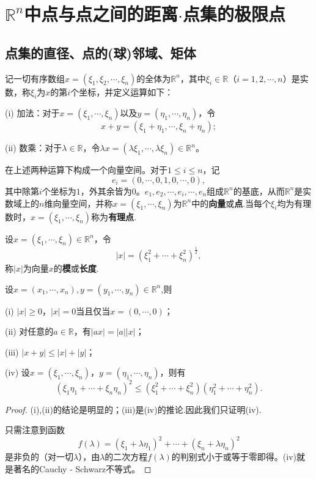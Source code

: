 \documentclass[../../main.tex]{subfiles}
\begin{document}
\section{$\mathbb{R}^n$中点与点之间的距离$\cdot$点集的极限点}

\subsection{点集的直径、点的(球)邻域、矩体}

\begin{definition}\label{definition:Rn与Rn中的运算}
  记一切有序数组\(x = (\xi_1,\xi_2,\cdots,\xi_n)\)的全体为\(\mathbb{R}^n\)，其中\(\xi_i\in\mathbb{R}\)（\(i = 1,2,\cdots,n\)）是实数，称\(\xi_i\)为\(x\)的第\(i\)个坐标，并定义运算如下：

(i) 加法：对于\(x = (\xi_1,\cdots,\xi_n)\)以及\(y = (\eta_1,\cdots,\eta_n)\)，令
\[x + y = (\xi_1+\eta_1,\cdots,\xi_n+\eta_n);\]

(ii) 数乘：对于\(\lambda\in\mathbb{R}\)，令\(\lambda x = (\lambda\xi_1,\cdots,\lambda\xi_n)\in\mathbb{R}^n\)。

在上述两种运算下构成一个向量空间。对于\(1\leqslant i\leqslant n\)，记
\[e_i = (0,\cdots,0,1,0,\cdots,0),\]
其中除第\(i\)个坐标为\(1\)，外其余皆为\(0\)。\(e_1,e_2,\cdots,e_i,\cdots,e_n\)组成\(\mathbb{R}^n\)的基底，从而\(\mathbb{R}^n\)是实数域上的\(n\)维向量空间，并称\(x = (\xi_1,\cdots,\xi_n)\)为\(\mathbb{R}^n\)中的\textbf{向量}或\textbf{点}.当每个\(\xi_i\)均为有理数时，\(x = (\xi_1,\cdots,\xi_n)\)称为\textbf{有理点}.
\end{definition}

\begin{definition}
设\(x = (\xi_1,\cdots,\xi_n)\in\mathbb{R}^n\)，令
\[|x| = (\xi_1^2+\cdots+\xi_n^2)^{\frac{1}{2}},\]
称\(|x|\)为向量\(x\)的\textbf{模}或\textbf{长度}.
\end{definition}

\begin{proposition}[向量的模的性质]\label{proposition:向量的模的性质}
设\(x=(x_1,\cdots ,x_n),y=\left( y_1,\cdots ,y_n \right) \in \mathbb{R} ^n\),则

(i) \(|x|\geqslant0\)，\(|x| = 0\)当且仅当\(x=(0,\cdots,0)\)；

(ii) 对任意的\(a\in\mathbb{R}\)，有\(|ax| = |a||x|\)；

(iii) \(|x + y|\leqslant|x|+|y|\)；

(iv) 设\(x = (\xi_1,\cdots,\xi_n)\)，\(y = (\eta_1,\cdots,\eta_n)\)，则有
\[(\xi_1\eta_1+\cdots+\xi_n\eta_n)^2\leqslant(\xi_1^2+\cdots+\xi_n^2)(\eta_1^2+\cdots+\eta_n^2).\]
\end{proposition}
\begin{proof}
  (i),(ii)的结论是明显的；(iii)是(iv)的推论.因此我们只证明(iv).

只需注意到函数
\[f(\lambda)=(\xi_1+\lambda\eta_1)^2+\cdots+(\xi_n+\lambda\eta_n)^2\]
是非负的（对一切\(\lambda\)），由\(\lambda\)的二次方程\(f(\lambda)\)的判别式小于或等于零即得。(iv)就是著名的Cauchy - Schwarz不等式。
\end{proof}
\end{document}
